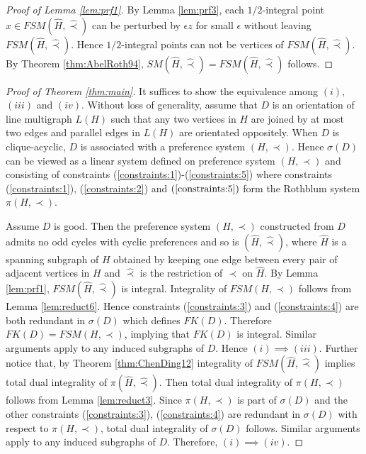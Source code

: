 \documentclass[11pt]{article}
\numberwithin{theorem}{section}
\begin{document}
\begin{proof}[Proof of Lemma \ref{lem:prf1}]
By Lemma \ref{lem:prf3}, each $1/2$-integral point $x\in FSM(\hat{H},\hat\prec)$ can be perturbed by $\epsilon z$ for small $\epsilon$ without leaving $FSM(\hat{H},\hat\prec)$. Hence $1/2$-integral points can not be vertices of $FSM(\hat{H},\hat\prec)$. By Theorem \ref{thm:AbelRoth94}, $SM(\hat{H},\hat\prec)=FSM(\hat{H},\hat\prec)$ follows. 
\end{proof}

\begin{proof}[Proof of Theorem \ref{thm:main}]
It suffices to show the equivalence among $(i)$, $(iii)$ and $(iv)$. Without loss of generality, assume that $D$ is an orientation of line multigraph $L(H)$ such that any two vertices in $H$ are joined by at most two edges and parallel edges in $L(H)$ are orientated oppositely. When $D$ is clique-acyclic, $D$ is associated with a preference system $(H,\prec)$. Hence $\sigma(D)$ can be viewed as a linear system defined on preference system $(H,\prec)$ and consisting of constraints (\ref{constraints:1})-(\ref{constraints:5}) where constraints (\ref{constraints:1}), (\ref{constraints:2}) and $(\ref{constraints:5})$ form the Rothblum system $\pi(H,\prec)$.

Assume $D$ is good. Then the preference system $(H,\prec)$ constructed from $D$ admits no odd cycles with cyclic preferences and so is $(\hat{H},\hat\prec)$, where $\hat{H}$ is a spanning subgraph of $H$ obtained by keeping one edge between every pair of adjacent vertices in $H$ and $\hat\prec$ is the restriction of $\prec$ on $\hat{H}$. By Lemma \ref{lem:prf1}, $FSM(\hat{H},\hat\prec)$ is integral. Integrality of $FSM(H,\prec)$ follows from Lemma \ref{lem:reduct6}. Hence constraints (\ref{constraints:3}) and (\ref{constraints:4}) are both redundant in $\sigma(D)$ which defines $FK(D)$. Therefore $FK(D)=FSM(H,\prec)$, implying that $FK(D)$ is integral. Similar arguments apply to any induced subgraphs of $D$. Hence $(i)\implies (iii)$. Further notice that, by Theorem \ref{thm:ChenDing12} integrality of $FSM(\hat{H},\hat\prec)$ implies total dual integrality of $\pi(\hat{H},\hat\prec)$. Then total dual integrality of $\pi(H,\prec)$ follows from Lemma \ref{lem:reduct3}. Since $\pi(H,\prec)$ is part of $\sigma(D)$ and the other constraints (\ref{constraints:3}), (\ref{constraints:4}) are redundant in $\sigma(D)$ with respect to $\pi(H,\prec)$, total dual integrality of $\sigma(D)$ follows. Similar arguments apply to any induced subgraphs of $D$. Therefore, $(i)\implies (iv)$.


\end{proof}
\end{document}
